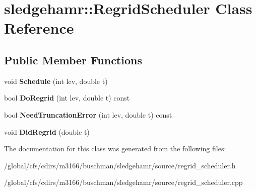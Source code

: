 \hypertarget{classsledgehamr_1_1RegridScheduler}{}\section{sledgehamr\+:\+:Regrid\+Scheduler Class Reference}
\label{classsledgehamr_1_1RegridScheduler}
\subsection*{Public Member Functions}
\begin{DoxyCompactItemize}
\item 
\mbox{\label{classsledgehamr_1_1RegridScheduler_ae5caf3673568ad9a7bfe3bc1d471e69d}} 
void {\bfseries Schedule} (int lev, double t)
\item 
\mbox{\label{classsledgehamr_1_1RegridScheduler_a9d92eb153ff6fbd334c39c22bef57da0}} 
bool {\bfseries Do\+Regrid} (int lev, double t) const
\item 
\mbox{\label{classsledgehamr_1_1RegridScheduler_a0a49110b83beb48474b92d596d7bd2d5}} 
bool {\bfseries Need\+Truncation\+Error} (int lev, double t) const
\item 
\mbox{\label{classsledgehamr_1_1RegridScheduler_a26b2584d874cdb4108f852be9fafee7c}} 
void {\bfseries Did\+Regrid} (double t)
\end{DoxyCompactItemize}


The documentation for this class was generated from the following files\+:\begin{DoxyCompactItemize}
\item 
/global/cfs/cdirs/m3166/buschman/sledgehamr/source/regrid\+\_\+scheduler.\+h\item 
/global/cfs/cdirs/m3166/buschman/sledgehamr/source/regrid\+\_\+scheduler.\+cpp\end{DoxyCompactItemize}
